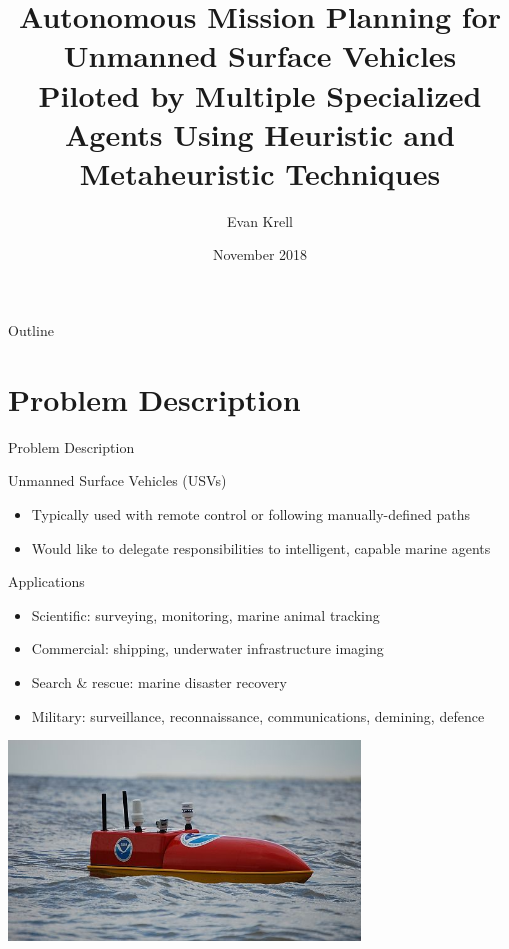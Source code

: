 \documentclass[9pt]{beamer}
\title[PPT - Autonomous Mission Planning for Unmanned Surface Vehicles..]{Autonomous Mission Planning for Unmanned Surface Vehicles Piloted by Multiple Specialized Agents Using Heuristic and Metaheuristic Techniques}
\author{Evan Krell}
\institute{Texas A\&M University - Corpus Christi}
\date{November 2018}
\begin{document}
\begin{frame}
  \titlepage
\end{frame}

\begin{frame}{Outline}
  \tableofcontents
\end{frame}

\section{Problem Description}

\begin{frame}{Problem Description}
    \begin{block}{Unmanned Surface Vehicles (USVs)}
	    \begin{itemize}
    	    \item Typically used with remote control or following manually-defined paths
    	    \item Would like to delegate responsibilities to intelligent, capable marine agents
        \end{itemize}
    \end{block}
    \begin{block}{Applications}
	    \begin{itemize}
    	    \item Scientific: surveying, monitoring, marine animal tracking	    
	        \item Commercial: shipping, underwater infrastructure imaging
	        \item Search \& rescue: marine disaster recovery
    	    \item Military: surveillance, reconnaissance, communications, demining, defence
        \end{itemize}
    \end{block}
    \begin{center}
        \includegraphics[width=0.7\textwidth,trim={1cm 2cm 1cm 1cm},clip]{img/EMILY_NOAA.jpg}
    \end{center}
\end{frame}
\end{document}
